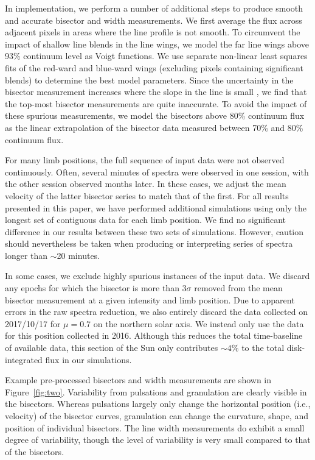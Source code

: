\documentclass[twocolumn]{aastex63}
\begin{document}
In implementation, we perform a number of additional steps to produce smooth and accurate bisector and width measurements. We first average the flux across adjacent pixels in areas where the line profile is not smooth. To circumvent the impact of shallow line blends in the line wings, we model the far line wings above 93\% continuum level as Voigt functions. We use separate non-linear least squares fits of the red-ward and blue-ward wings (excluding pixels containing significant blends) to determine the best model parameters. Since the uncertainty in the bisector measurement increases where the slope in the line is small \citep{Gray2008}, we find that the top-most bisector measurements are quite inaccurate. To avoid the impact of these spurious measurements, we model the bisectors above 80\% continuum flux as the linear extrapolation of the bisector data measured between 70\% and 80\% continuum flux. \par 

For many limb positions, the full sequence of input data were not observed continuously. Often, several minutes of spectra were observed in one session, with the other session observed months later. In these cases, we adjust the mean velocity of the latter bisector series to match that of the first. For all results presented in this paper, we have performed additional simulations using only the longest set of contiguous data for each limb position. We find no significant difference in our results between these two sets of simulations. However, caution should nevertheless be taken when producing or interpreting series of spectra longer than $\sim$20 minutes. \par 

In some cases, we exclude highly spurious instances of the input data. We discard any epochs for which the bisector is more than $3\sigma$ removed from the mean bisector measurement at a given intensity and limb position. Due to apparent errors in the raw spectra reduction, we also entirely discard the data collected on 2017/10/17 for $\mu = 0.7$ on the northern solar axis. We instead only use the data for this position collected in 2016. Although this reduces the total time-baseline of available data, this section of the Sun only contributes $\sim$$4\%$ to the total disk-integrated flux in our simulations. \par 

Example pre-processed bisectors and width measurements are shown in Figure~\ref{fig:two}. Variability from pulsations and granulation are clearly visible in the bisectors. Whereas pulsations largely only change the horizontal position (i.e., velocity) of the bisector curves, granulation can change the curvature, shape, and position of individual bisectors. The line width measurements do exhibit a small degree of variability, though the level of variability is very small compared to that of the bisectors. \par 
\end{document}
